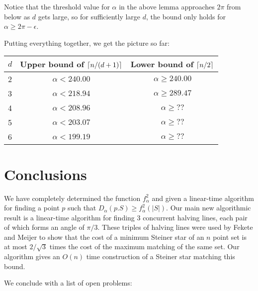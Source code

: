\documentclass[lotsofwhite]{patmorin}
\begin{document}
{Notice that the threshold value for $\alpha$ in the above lemma
approaches $2\pi$ from below as $d$ gets large, so for sufficiently
large $d$, the bound only holds for $\alpha \ge 2\pi -\epsilon$.

Putting everything together, we get the picture so far:

\begin{tabular}{l|cc}
$d$ & Upper bound of $\left\lceil n/(d+1) \right\rceil$ & Lower bound of $\left\lceil n/2 \right\rceil$ \\
\hline
2 & $\alpha < 240.00$ & $\alpha \ge 240.00$ \\
3 & $\alpha < 218.94$ & $\alpha \ge 289.47$ \\
4 & $\alpha < 208.96$ & $\alpha \ge ??$ \\
5 & $\alpha < 203.07$ & $\alpha \ge ??$ \\
6 & $\alpha < 199.19$ & $\alpha \ge ??$ \\
\end{tabular}
}





\section{Conclusions}

We have completely determined the function $f^2_\alpha$ and given a
linear-time algorithm for finding a point $p$ such that
$D_\alpha(p.S)\ge f^2_\alpha(|S|)$.  Our main new algorithmic result
is a linear-time algorithm for finding 3 concurrent halving lines,
each pair of which forms an angle of $\pi/3$.  These triples of
halving lines were used by Fekete and Meijer to show that the cost of
a minimum Steiner star of an $n$ point set is at most $2/\sqrt{3}$
times the cost of the maximum matching of the same set.  Our algorithm
gives an $O(n)$ time construction of a Steiner star matching this
bound.



We conclude with a list of open problems:
\end{document}
